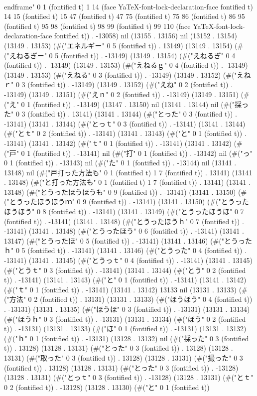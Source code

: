 \\end{frame}" 0 1 (fontified t) 1 14 (face YaTeX-font-lock-declaration-face fontified t) 14 15 (fontified t) 15 47 (fontified t) 47 75 (fontified t) 75 86 (fontified t) 86 95 (fontified t) 95 98 (fontified t) 98 99 (fontified t) 99 110 (face YaTeX-font-lock-declaration-face fontified t)) . -13058) nil (13155 . 13156) nil (13152 . 13154) (13149 . 13153) (#("エネルギー" 0 5 (fontified t)) . 13149) (13149 . 13154) (#("えねるぎー" 0 5 (fontified t)) . -13149) (13149 . 13154) (#("えねるぎ" 0 4 (fontified t)) . -13149) (13149 . 13153) (#("えねるｇ" 0 4 (fontified t)) . -13149) (13149 . 13153) (#("えねる" 0 3 (fontified t)) . -13149) (13149 . 13152) (#("えねｒ" 0 3 (fontified t)) . -13149) (13149 . 13152) (#("えね" 0 2 (fontified t)) . -13149) (13149 . 13151) (#("えｎ" 0 2 (fontified t)) . -13149) (13149 . 13151) (#("え" 0 1 (fontified t)) . -13149) (13147 . 13150) nil (13141 . 13144) nil (#("採った" 0 3 (fontified t)) . 13141) (13141 . 13144) (#("とった" 0 3 (fontified t)) . -13141) (13141 . 13144) (#("とっｔ" 0 3 (fontified t)) . -13141) (13141 . 13144) (#("とｔ" 0 2 (fontified t)) . -13141) (13141 . 13143) (#("と" 0 1 (fontified t)) . -13141) (13141 . 13142) (#("ｔ" 0 1 (fontified t)) . -13141) (13141 . 13142) (#("戸" 0 1 (fontified t)) . -13141) nil (#("打" 0 1 (fontified t)) . -13142) nil (#("っ" 0 1 (fontified t)) . -13143) nil (#("た" 0 1 (fontified t)) . -13144) nil (13141 . 13148) nil (#("戸打った方法も" 0 1 (fontified t) 1 7 (fontified t)) . 13141) (13141 . 13148) (#("と打った方法も" 0 1 (fontified t) 1 7 (fontified t)) . 13141) (13141 . 13148) (#("とうったほうほうも" 0 9 (fontified t)) . -13141) (13141 . 13150) (#("とうったほうほうｍ" 0 9 (fontified t)) . -13141) (13141 . 13150) (#("とうったほうほう" 0 8 (fontified t)) . -13141) (13141 . 13149) (#("とうったほうほ" 0 7 (fontified t)) . -13141) (13141 . 13148) (#("とうったほうｈ" 0 7 (fontified t)) . -13141) (13141 . 13148) (#("とうったほう" 0 6 (fontified t)) . -13141) (13141 . 13147) (#("とうったほ" 0 5 (fontified t)) . -13141) (13141 . 13146) (#("とうったｈ" 0 5 (fontified t)) . -13141) (13141 . 13146) (#("とうった" 0 4 (fontified t)) . -13141) (13141 . 13145) (#("とうっｔ" 0 4 (fontified t)) . -13141) (13141 . 13145) (#("とうｔ" 0 3 (fontified t)) . -13141) (13141 . 13144) (#("とう" 0 2 (fontified t)) . -13141) (13141 . 13143) (#("と" 0 1 (fontified t)) . -13141) (13141 . 13142) (#("ｔ" 0 1 (fontified t)) . -13141) (13141 . 13142) 13133 nil (13131 . 13133) (#("方法" 0 2 (fontified t)) . 13131) (13131 . 13133) (#("ほうほう" 0 4 (fontified t)) . -13131) (13131 . 13135) (#("ほうほ" 0 3 (fontified t)) . -13131) (13131 . 13134) (#("ほうｈ" 0 3 (fontified t)) . -13131) (13131 . 13134) (#("ほう" 0 2 (fontified t)) . -13131) (13131 . 13133) (#("ほ" 0 1 (fontified t)) . -13131) (13131 . 13132) (#("ｈ" 0 1 (fontified t)) . -13131) (13128 . 13132) nil (#("採った" 0 3 (fontified t)) . 13128) (13128 . 13131) (#("とった" 0 3 (fontified t)) . 13128) (13128 . 13131) (#("取った" 0 3 (fontified t)) . 13128) (13128 . 13131) (#("撮った" 0 3 (fontified t)) . 13128) (13128 . 13131) (#("とった" 0 3 (fontified t)) . -13128) (13128 . 13131) (#("とっｔ" 0 3 (fontified t)) . -13128) (13128 . 13131) (#("とｔ" 0 2 (fontified t)) . -13128) (13128 . 13130) (#("と" 0 1 (fontified t)) 
